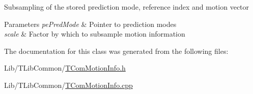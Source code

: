 Subsampling of the stored prediction mode, reference index and motion vector 
\begin{DoxyParams}{Parameters}
{\em pe\+Pred\+Mode} & Pointer to prediction modes \\
\hline
{\em scale} & Factor by which to subsample motion information \\
\hline
\end{DoxyParams}


The documentation for this class was generated from the following files\+:\begin{DoxyCompactItemize}
\item 
Lib/\+T\+Lib\+Common/\hyperlink{_t_com_motion_info_8h}{T\+Com\+Motion\+Info.\+h}\item 
Lib/\+T\+Lib\+Common/\hyperlink{_t_com_motion_info_8cpp}{T\+Com\+Motion\+Info.\+cpp}\end{DoxyCompactItemize}
